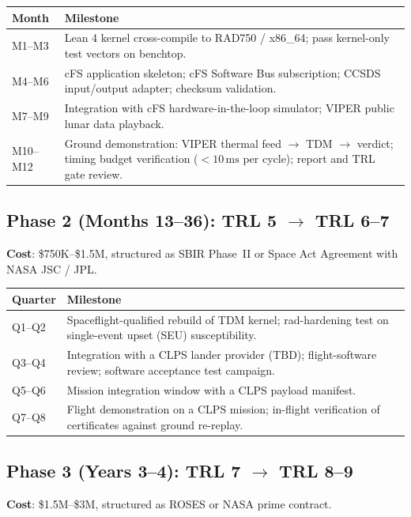 \documentclass[11pt,a4paper]{article}
\begin{document}
\begin{tabular}{p{2.5cm}p{12cm}}
\toprule
\textbf{Month} & \textbf{Milestone} \\
\midrule
M1--M3   & Lean 4 kernel cross-compile to RAD750 / x86\_64; pass kernel-only
           test vectors on benchtop. \\
M4--M6   & cFS application skeleton; cFS Software Bus subscription; CCSDS
           input/output adapter; checksum validation. \\
M7--M9   & Integration with cFS hardware-in-the-loop simulator; VIPER public
           lunar data playback. \\
M10--M12 & Ground demonstration: VIPER thermal feed $\to$ TDM $\to$ verdict;
           timing budget verification ($<10\,\mathrm{ms}$ per cycle);
           report and TRL gate review. \\
\bottomrule
\end{tabular}

\subsection*{Phase 2 (Months 13--36): TRL 5 $\to$ TRL 6--7}

\textbf{Cost}: \$750K--\$1.5M, structured as SBIR Phase~II or Space Act
Agreement with NASA JSC / JPL.

\begin{tabular}{p{2.5cm}p{12cm}}
\toprule
\textbf{Quarter} & \textbf{Milestone} \\
\midrule
Q1--Q2 & Spaceflight-qualified rebuild of TDM kernel; rad-hardening test on
         single-event upset (SEU) susceptibility. \\
Q3--Q4 & Integration with a CLPS lander provider (TBD); flight-software
         review; software acceptance test campaign. \\
Q5--Q6 & Mission integration window with a CLPS payload manifest. \\
Q7--Q8 & Flight demonstration on a CLPS mission; in-flight verification of
         certificates against ground re-replay. \\
\bottomrule
\end{tabular}

\subsection*{Phase 3 (Years 3--4): TRL 7 $\to$ TRL 8--9}

\textbf{Cost}: \$1.5M--\$3M, structured as ROSES or NASA prime contract.
\end{document}
